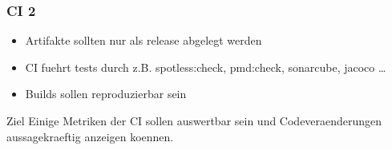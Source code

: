 \begin{frame}
    \frametitle{CI 2}
    \begin{itemize}
      \item Artifakte sollten nur als release abgelegt werden
      \item CI fuehrt tests durch z.B. spotless:check, pmd:check, sonarcube, jacoco \dots
      \item Builds sollen reproduzierbar sein
    \end{itemize}
    \begin{block}{Ziel}
        Einige Metriken der CI sollen auswertbar sein und Codeveraenderungen aussagekraeftig anzeigen koennen.
    \end{block}
\end{frame}

